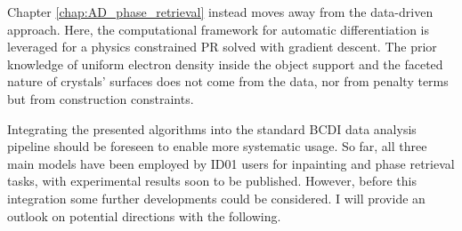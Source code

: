 Chapter \ref{chap:AD_phase_retrieval} instead moves away from the data-driven approach. Here, the
computational framework for automatic differentiation is leveraged for a physics constrained PR solved 
with gradient descent. The prior knowledge of uniform electron density inside the object support and the faceted nature 
of crystals' surfaces does not come from the data, nor from penalty terms but from construction constraints. 

Integrating the presented algorithms into the standard BCDI data analysis pipeline should be foreseen
to enable more systematic usage. So far, all three main models have been employed by ID01 users for inpainting and 
phase retrieval tasks, with experimental results soon to be published. However, before this integration some further 
developments could be considered.
I will provide an outlook on potential directions with the following.

